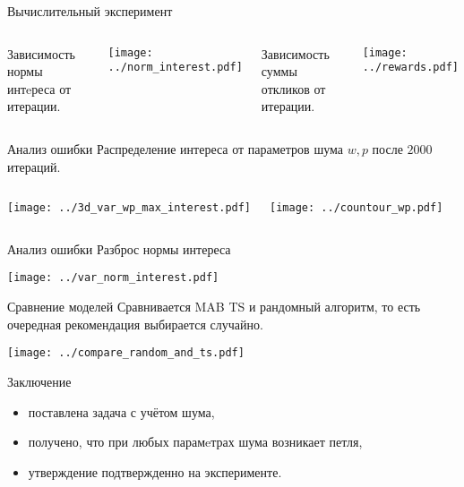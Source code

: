 \documentclass{beamer}
\begin{document}
\begin{frame}{Вычислительный эксперимент}
\begin{columns}[c]
Зависимость нормы интeреса от итерации.
\begin{center}
  \texttt{[image: ../norm\_interest.pdf]}
\end{center}
Зависимость суммы откликов от итерации.  
\begin{center}
  \texttt{[image: ../rewards.pdf]}
\end{center}
\end{columns}

\end{frame}
\begin{frame}{Анализ ошибки}
Распределение интереса от параметров шума $w, p$ после $2000$ итераций.
\begin{columns}[c]
\begin{center}
  \texttt{[image: ../3d\_var\_wp\_max\_interest.pdf]}
\end{center}
\begin{center}
  \texttt{[image: ../countour\_wp.pdf]}
\end{center}
\end{columns}
\end{frame}
\begin{frame}{Анализ ошибки}
Разброс нормы интереса
\begin{center}
  \texttt{[image: ../var\_norm\_interest.pdf]}
\end{center}
\end{frame}
\begin{frame}{Сравнение моделей}
Сравнивается MAB TS и рандомный алгоритм, то есть очередная рекомендация выбирается случайно.
\begin{center}
  \texttt{[image: ../compare\_random\_and\_ts.pdf]}
\end{center}
\end{frame}
\begin{frame}{Заключение}
  \begin{itemize}
      \item поставлена задача с учётом шума,
      \item получено, что при любых парамeтрах шума возникает петля,  
      \item утверждение подтвержденно на эксперименте.
  \end{itemize}
\end{frame}
\end{document}
